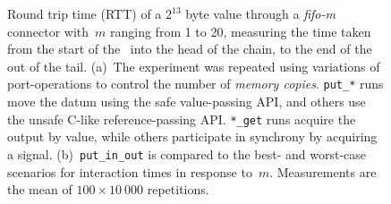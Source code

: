 \begin{figure}
{\begin{subfigure}[b]{0.63\textwidth}
			\caption{}
			\label{fig:fifo_m_1}
		\end{subfigure}%
	}
	\caption[RTT for fifo-M connector with $2^{13}$ byte values.]{Round trip time (RTT) of a $2^{13}$ byte value through a \textit{fifo-m} connector with~$m$ ranging from 1 to 20, measuring the time taken from the start of the~ into the head of the chain, to the end of the  out of the tail. (a)~The experiment was repeated using variations of port-operations to control the number of \textit{memory copies}. \texttt{put\_*} runs move the datum using the safe value-passing API, and others use the unsafe C-like reference-passing API. \texttt{*\_get} runs acquire the output by value, while others participate in synchrony by acquiring a signal. (b)~\texttt{put\_in\_out} is compared to the best- and worst-case scenarios for interaction times in response to~$m$. Measurements are the mean of $100\times{}10~000$ repetitions.}
	\label{fig:fifo_m}
\end{figure}

